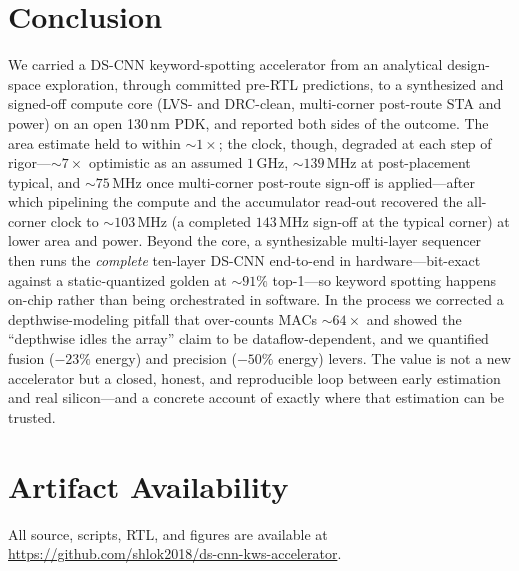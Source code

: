 \documentclass[conference]{IEEEtran}
\newcommand{\x}{\ensuremath{\times}}
\newcommand{\approxs}{\ensuremath{\sim}}
\begin{document}
\section{Conclusion}
We carried a DS-CNN keyword-spotting accelerator from an analytical design-space
exploration, through committed pre-RTL predictions, to a synthesized and
signed-off compute core (LVS- and DRC-clean, multi-corner post-route STA and
power) on an open 130\,nm PDK, and reported both sides of the outcome. The area
estimate held to within \approxs$1\x$; the clock, though, degraded at each step
of rigor---\approxs$7\x$ optimistic as an assumed $1$\,GHz, \approxs$139$\,MHz at
post-placement typical, and \approxs$75$\,MHz once multi-corner post-route
sign-off is applied---after which pipelining the compute and the accumulator
read-out recovered the all-corner clock to \approxs$103$\,MHz (a completed
$143$\,MHz sign-off at the typical corner) at lower area and power. Beyond the
core, a synthesizable multi-layer sequencer then runs the \emph{complete}
ten-layer DS-CNN end-to-end in hardware---bit-exact against a static-quantized
golden at \approxs$91\%$ top-1---so keyword spotting happens on-chip rather than
being orchestrated in software. In the
process we corrected a depthwise-modeling pitfall that over-counts MACs
\approxs$64\x$ and showed the ``depthwise idles the array'' claim to be
dataflow-dependent, and we quantified fusion ($-23\%$ energy) and precision
($-50\%$ energy) levers. The value is not a new accelerator but a closed,
honest, and reproducible loop between early estimation and real silicon---and a
concrete account of exactly where that estimation can be trusted.

\section*{Artifact Availability}
All source, scripts, RTL, and figures are available at
\url{https://github.com/shlok2018/ds-cnn-kws-accelerator}.
\end{document}
